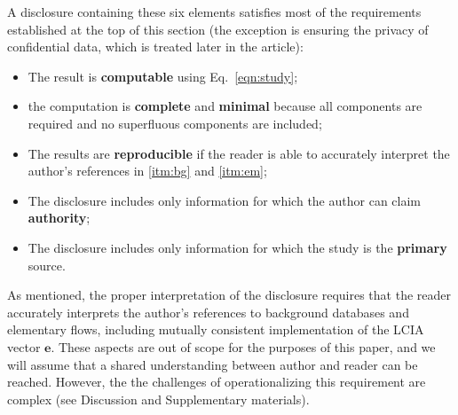 A disclosure containing these six elements satisfies most of the requirements established at the top of this section (the exception is ensuring the privacy of confidential data, which is treated later in the article):
\begin{itemize}
  \item The result is \textbf{computable} using Eq.~\ref{eqn:study};
  \item the computation is \textbf{complete} and \textbf{minimal} because all components are required and no superfluous components are included;
  \item The results are \textbf{reproducible} if the reader is able to accurately interpret the author's references in \ref{itm:bg} and \ref{itm:em};
  \item The disclosure includes only information for which the author can claim \textbf{authority};
  \item The disclosure includes only information for which the study is the \textbf{primary} source.  
\end{itemize}
As mentioned, the proper interpretation of the disclosure requires that the reader accurately interprets the author's references to background databases and elementary flows, including mutually consistent implementation of the LCIA vector $\mathbf{e}$.  These aspects are out of scope for the purposes of this paper, and we will assume that a shared understanding between author and reader can be reached.  However, the the challenges of operationalizing this requirement are complex (see Discussion and Supplementary materials).  %

